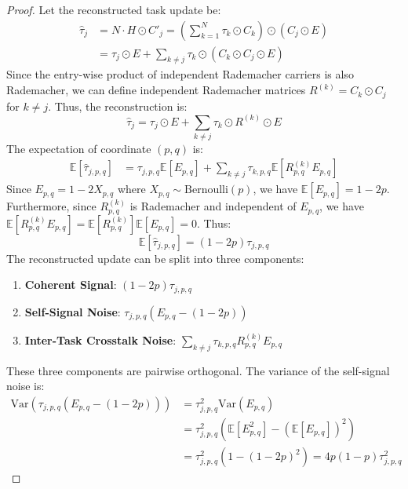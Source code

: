 \documentclass{article}
\begin{document}
\begin{proof}
Let the reconstructed task update be:
\begin{align*}
    \hat{\tau}_j &= N \cdot H \odot C'_j = \left( \sum_{k=1}^N \tau_k \odot C_k \right) \odot (C_j \odot E) \\
    &= \tau_j \odot E + \sum_{k \neq j} \tau_k \odot (C_k \odot C_j \odot E)
\end{align*}
Since the entry-wise product of independent Rademacher carriers is also Rademacher, we can define independent Rademacher matrices $R^{(k)} = C_k \odot C_j$ for $k \neq j$. Thus, the reconstruction is:
\begin{equation}
    \hat{\tau}_j = \tau_j \odot E + \sum_{k \neq j} \tau_k \odot R^{(k)} \odot E
\end{equation}
The expectation of coordinate $(p, q)$ is:
\begin{align*}
    \mathbb{E}[\hat{\tau}_{j, p, q}] &= \tau_{j, p, q} \mathbb{E}[E_{p, q}] + \sum_{k \neq j} \tau_{k, p, q} \mathbb{E}[R^{(k)}_{p, q} E_{p, q}]
\end{align*}
Since $E_{p, q} = 1 - 2 X_{p, q}$ where $X_{p, q} \sim \text{Bernoulli}(p)$, we have $\mathbb{E}[E_{p, q}] = 1 - 2p$.
Furthermore, since $R^{(k)}_{p, q}$ is Rademacher and independent of $E_{p, q}$, we have $\mathbb{E}[R^{(k)}_{p, q} E_{p, q}] = \mathbb{E}[R^{(k)}_{p, q}] \mathbb{E}[E_{p, q}] = 0$.
Thus:
\begin{equation}
    \mathbb{E}[\hat{\tau}_{j, p, q}] = (1-2p) \tau_{j, p, q}
\end{equation}
The reconstructed update can be split into three components:
\begin{enumerate}
    \item \textbf{Coherent Signal}: $(1-2p) \tau_{j, p, q}$
    \item \textbf{Self-Signal Noise}: $\tau_{j, p, q} (E_{p, q} - (1-2p))$
    \item \textbf{Inter-Task Crosstalk Noise}: $\sum_{k \neq j} \tau_{k, p, q} R^{(k)}_{p, q} E_{p, q}$
\end{enumerate}
These three components are pairwise orthogonal. The variance of the self-signal noise is:
\begin{align*}
    \text{Var}(\tau_{j, p, q} (E_{p, q} - (1-2p))) &= \tau_{j, p, q}^2 \text{Var}(E_{p, q}) \\
    &= \tau_{j, p, q}^2 \left( \mathbb{E}[E_{p, q}^2] - (\mathbb{E}[E_{p, q}])^2 \right) \\
    &= \tau_{j, p, q}^2 \left( 1 - (1-2p)^2 \right) = 4p(1-p) \tau_{j, p, q}^2

\end{align*}
\end{proof}
\end{document}
